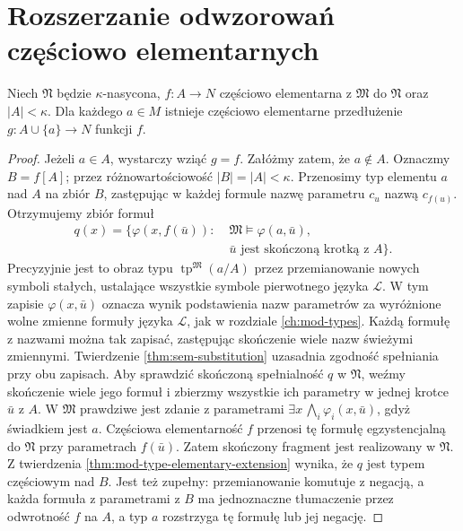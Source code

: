 \section{Rozszerzanie odwzorowań częściowo elementarnych}
\begin{lemat}
\label{lem:mod-saturation-forth}
Niech $\mathfrak N$ będzie $\kappa$-nasycona,
$f:A\to N$ częściowo elementarna z $\mathfrak M$ do
$\mathfrak N$ oraz $|A|<\kappa$. Dla każdego $a\in M$
istnieje częściowo elementarne przedłużenie
$g:A\cup\{a\}\to N$ funkcji $f$.
\end{lemat}
\begin{proof}
Jeżeli $a\in A$, wystarczy wziąć $g=f$. Załóżmy zatem,
że $a\notin A$. Oznaczmy $B=f[A]$; przez różnowartościowość
$|B|=|A|<\kappa$. Przenosimy typ elementu $a$ nad $A$
na zbiór $B$, zastępując w każdej formule nazwę parametru
$c_u$ nazwą $c_{f(u)}$. Otrzymujemy zbiór formuł
\[
\begin{aligned}
q(x)=\{\varphi(x,f(\bar u)):\;&
       \mathfrak M\models\varphi(a,\bar u),\\
       &\bar u\text{ jest skończoną krotką z }A\}.
\end{aligned}
\]
Precyzyjnie jest to obraz typu
$\operatorname{tp}^{\mathfrak M}(a/A)$ przez przemianowanie
nowych symboli stałych, ustalające wszystkie symbole
pierwotnego języka $\mathcal L$.
W tym zapisie $\varphi(x,\bar u)$ oznacza wynik podstawienia
nazw parametrów za wyróżnione wolne zmienne formuły
języka $\mathcal L$, jak w rozdziale \ref{ch:mod-types}.
Każdą formułę z nazwami można tak zapisać, zastępując
skończenie wiele nazw świeżymi zmiennymi.
Twierdzenie \ref{thm:sem-substitution} uzasadnia zgodność
spełniania przy obu zapisach.
Aby sprawdzić skończoną spełnialność $q$ w $\mathfrak N$,
weźmy skończenie wiele jego formuł i zbierzmy wszystkie
ich parametry w jednej krotce $\bar u$ z $A$.
W $\mathfrak M$ prawdziwe jest zdanie z parametrami
$\exists x\,\bigwedge_i\varphi_i(x,\bar u)$, gdyż
świadkiem jest $a$. Częściowa elementarność $f$ przenosi
tę formułę egzystencjalną do $\mathfrak N$ przy
parametrach $f(\bar u)$. Zatem skończony fragment
jest realizowany w $\mathfrak N$.
Z twierdzenia \ref{thm:mod-type-elementary-extension}
wynika, że $q$ jest typem częściowym nad $B$.
Jest też zupełny: przemianowanie komutuje z negacją,
a każda formuła z parametrami z $B$
ma jednoznaczne tłumaczenie przez odwrotność $f$ na $A$,
a typ $a$ rozstrzyga tę formułę lub jej negację.


\end{proof}
